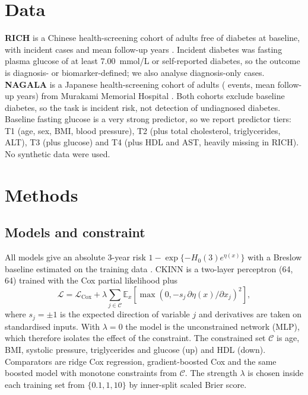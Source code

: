 \documentclass[11pt]{article}
\begin{document}
\section{Data}
\textbf{RICH} is a Chinese health-screening cohort of \nrich{} adults free of diabetes at baseline, with \evrich{} incident cases and mean follow-up \furich{} years \citep{chen2018}. Incident diabetes was fasting plasma glucose of at least 7.00~mmol/L or self-reported diabetes, so the outcome is diagnosis- or biomarker-defined; we also analyse diagnosis-only cases. \textbf{NAGALA} is a Japanese health-screening cohort of \nnagala{} adults (\evnagala{} events, mean follow-up \funagala{} years) from Murakami Memorial Hospital \citep{okamura2019}. Both cohorts exclude baseline diabetes, so the task is incident risk, not detection of undiagnosed diabetes. Baseline fasting glucose is a very strong predictor, so we report predictor tiers: T1 (age, sex, BMI, blood pressure), T2 (plus total cholesterol, triglycerides, ALT), T3 (plus glucose) and T4 (plus HDL and AST, heavily missing in RICH). No synthetic data were used.

\section{Methods}
\subsection{Models and constraint}
All models give an absolute 3-year risk $1-\exp\{-H_0(3)e^{\eta(x)}\}$ with a Breslow baseline estimated on the training data \citep{cox1972}. CKINN is a two-layer perceptron (64, 64) trained with the Cox partial likelihood plus
\begin{equation}
\mathcal{L}=\mathcal{L}_{\mathrm{Cox}}+\lambda\sum_{j\in\mathcal{C}}\mathbb{E}_x\!\left[\max\!\left(0,-s_j\,\partial\eta(x)/\partial x_j\right)^2\right],
\end{equation}
where $s_j=\pm1$ is the expected direction of variable $j$ and derivatives are taken on standardised inputs. With $\lambda=0$ the model is the unconstrained network (MLP), which therefore isolates the effect of the constraint. The constrained set $\mathcal{C}$ is age, BMI, systolic pressure, triglycerides and glucose (up) and HDL (down). Comparators are ridge Cox regression, gradient-boosted Cox \citep{chen2016xgb} and the same boosted model with monotone constraints from $\mathcal{C}$. The strength $\lambda$ is chosen inside each training set from $\{0.1,1,10\}$ by inner-split scaled Brier score.
\end{document}
